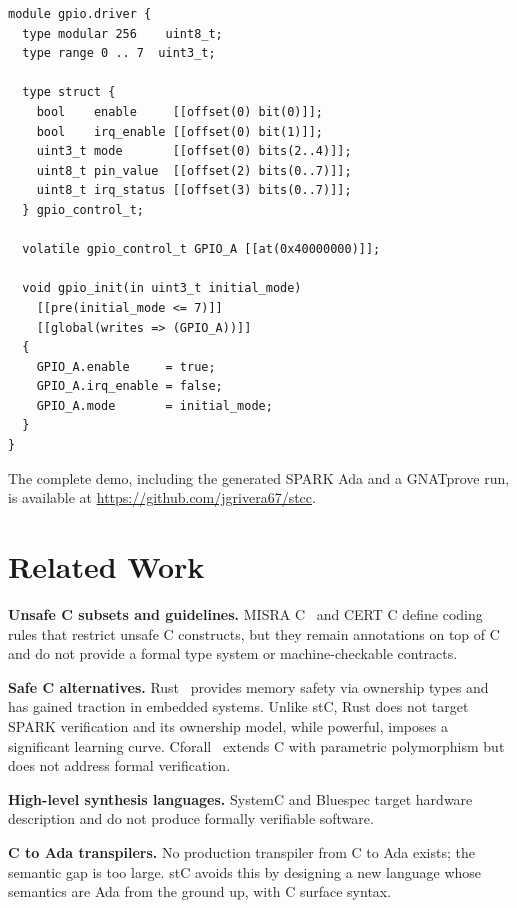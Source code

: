 \documentclass[runningheads]{llncs}
\begin{document}
\begin{lstlisting}[caption={Complete GPIO driver module in stC}]
module gpio.driver {
  type modular 256    uint8_t;
  type range 0 .. 7  uint3_t;

  type struct {
    bool    enable     [[offset(0) bit(0)]];
    bool    irq_enable [[offset(0) bit(1)]];
    uint3_t mode       [[offset(0) bits(2..4)]];
    uint8_t pin_value  [[offset(2) bits(0..7)]];
    uint8_t irq_status [[offset(3) bits(0..7)]];
  } gpio_control_t;

  volatile gpio_control_t GPIO_A [[at(0x40000000)]];

  void gpio_init(in uint3_t initial_mode)
    [[pre(initial_mode <= 7)]]
    [[global(writes => (GPIO_A))]]
  {
    GPIO_A.enable     = true;
    GPIO_A.irq_enable = false;
    GPIO_A.mode       = initial_mode;
  }
}
\end{lstlisting}

The complete demo, including the generated SPARK Ada and a GNATprove run,
is available at \url{https://github.com/jgrivera67/stcc}.

\section{Related Work}
\label{sec:related}

\textbf{Unsafe C subsets and guidelines.} MISRA C~\cite{misra-c} and
CERT C define coding rules that restrict unsafe C constructs, but they remain
annotations on top of C and do not provide a formal type system or
machine-checkable contracts.

\textbf{Safe C alternatives.} Rust~\cite{rust} provides memory safety via
ownership types and has gained traction in embedded systems. Unlike stC, Rust
does not target SPARK verification and its ownership model, while powerful,
imposes a significant learning curve. Cforall~\cite{cforall} extends C with
parametric polymorphism but does not address formal verification.

\textbf{High-level synthesis languages.} SystemC and Bluespec target
hardware description and do not produce formally verifiable software.

\textbf{C to Ada transpilers.} No production transpiler from C to Ada exists;
the semantic gap is too large. stC avoids this by designing a new language
whose semantics are Ada from the ground up, with C surface syntax.
\end{document}

